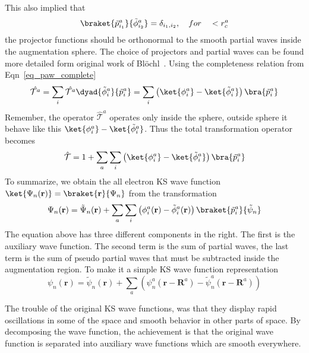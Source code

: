 This also implied that
\begin{equation}
	\braket{\tilde{p}_{i_1}^a}{\tilde{\phi}_{i_2}^a} = \delta_{i_1,i_2},\quad for \quad < r_c^a
\end{equation}
the projector functions should be orthonormal to the smooth partial waves inside the augmentation sphere. The choice of projectors and partial waves can be found more detailed form original work of Bl\"ochl~\cite{blochl1994projector}. Using the completeness relation from Eqn~\ref{eq_paw_complete}
\begin{equation}
\hat{\mathcal{T}^a} = \sum_i \hat{\mathcal{T}^a} \dyad{\tilde{\phi}_i^a}{\tilde{p}_i^a} = \sum_i \left( \ket{\phi_i^a} -\ket{\tilde{\phi}_i^a} \right) \bra{\tilde{p}_i^a}
\end{equation}
Remember, the operator $\hat{\mathcal{T}}^a$ operates only inside the sphere, outside sphere it behave like this $\ket{\phi_i^a} - \ket{\tilde{\phi}_i^a}$. Thus the total transformation operator becomes
\begin{equation}
\hat{\mathcal{T}} = 1 + \sum_a\sum_i\left( \ket{\phi_i^a} -\ket{\tilde{\phi}_i^a} \right) \bra{\tilde{p}_i^a} 
\end{equation}
To summarize, we obtain the all electron KS wave function $\ket{\Psi_n(\mathbf{r})} = \braket{\mathbf{r}}{\Psi_n}$ from the transformation
\begin{equation}
\label{eq_main_paw}
\Psi_n(\mathbf{r}) = \tilde{\Psi}_n(\mathbf{r}) + \sum_a\sum_i \left (\phi_i^a(\mathbf{r}) - \tilde{\phi}_i^a(\mathbf{r})   \right) \braket{\tilde{p}_i^a}{\tilde{\psi}_n}
\end{equation}
The equation above has three different components in the right. The first is the auxiliary wave function. The second term is the sum of partial waves, the last term is the sum of pseudo partial waves that must be subtracted inside the augmentation region. To make it a simple KS wave function representation
\begin{equation}
\psi_n(\mathbf{r}) = \tilde{\psi}_n(\mathbf{r}) + \sum_a\left( \psi_n^a(\mathbf{r}-\mathbf{R}^a) - \tilde{\psi}_n^a (\mathbf{r} - \mathbf{R}^a) \right)
\end{equation}

The trouble of the original KS wave functions, was that they display rapid oscillations in some of the space and smooth behavior in other parts of space. By decomposing the wave function, the achievement is that the original wave function is separated into auxiliary wave functions which are smooth everywhere.

